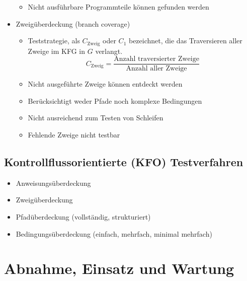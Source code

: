 \documentclass{article}
\begin{document}
\begin{itemize}
\begin{itemize}
\[    \]
    \item Nicht ausführbare Programmteile können gefunden werden
  \end{itemize}
  \item Zweigüberdeckung (branch coverage)
  \begin{itemize}
    \item Teststrategie, als $C_{\text{Zweig}}$ oder $C_1$ bezeichnet, die das Traversieren aller Zweige im KFG in $G$ verlangt.
    \[
    C_{\text{Zweig}}=\frac{\text{Anzahl traversierter Zweige}}{\text{Anzahl aller Zweige}}
    \]
    \item Nicht ausgeführte Zweige können entdeckt werden
    \item Berücksichtigt weder Pfade noch komplexe Bedingungen
    \item Nicht ausreichend zum Testen von Schleifen
    \item Fehlende Zweige nicht testbar
  \end{itemize}
\end{itemize}

\subsection{Kontrollflussorientierte (KFO) Testverfahren}
\begin{itemize}
  \item Anweisungsüberdeckung
  \item Zweigüberdeckung
  \item Pfadüberdeckung (vollständig, strukturiert)
  \item Bedingungsüberdeckung (einfach, mehrfach, minimal mehrfach)
\end{itemize}

\section{Abnahme, Einsatz und Wartung}
\end{document}
